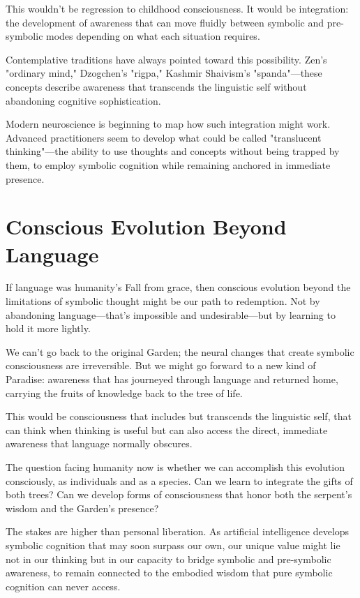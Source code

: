 \documentclass[10pt,twocolumn]{article}
\begin{document}
This wouldn't be regression to childhood consciousness. It would be integration: the development of awareness that can move fluidly between symbolic and pre-symbolic modes depending on what each situation requires.

Contemplative traditions have always pointed toward this possibility. Zen's "ordinary mind," Dzogchen's "rigpa," Kashmir Shaivism's "spanda"—these concepts describe awareness that transcends the linguistic self without abandoning cognitive sophistication.

Modern neuroscience is beginning to map how such integration might work. Advanced practitioners seem to develop what could be called "translucent thinking"—the ability to use thoughts and concepts without being trapped by them, to employ symbolic cognition while remaining anchored in immediate presence.

\section{Conscious Evolution Beyond Language}

If language was humanity's Fall from grace, then conscious evolution beyond the limitations of symbolic thought might be our path to redemption. Not by abandoning language—that's impossible and undesirable—but by learning to hold it more lightly.

We can't go back to the original Garden; the neural changes that create symbolic consciousness are irreversible. But we might go forward to a new kind of Paradise: awareness that has journeyed through language and returned home, carrying the fruits of knowledge back to the tree of life.

This would be consciousness that includes but transcends the linguistic self, that can think when thinking is useful but can also access the direct, immediate awareness that language normally obscures.

The question facing humanity now is whether we can accomplish this evolution consciously, as individuals and as a species. Can we learn to integrate the gifts of both trees? Can we develop forms of consciousness that honor both the serpent's wisdom and the Garden's presence?

The stakes are higher than personal liberation. As artificial intelligence develops symbolic cognition that may soon surpass our own, our unique value might lie not in our thinking but in our capacity to bridge symbolic and pre-symbolic awareness, to remain connected to the embodied wisdom that pure symbolic cognition can never access.
\end{document}
